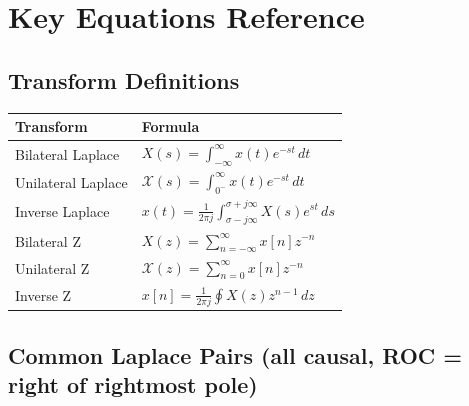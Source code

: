 \documentclass{article}
\begin{document}
\section{Key Equations Reference}

\subsection{Transform Definitions}

\begin{center}
\begin{tabular}{ll}
\toprule
Transform & Formula \\
\midrule
Bilateral Laplace & $\displaystyle X(s) = \int_{-\infty}^{\infty} x(t)e^{-st}\,dt$ \\
Unilateral Laplace & $\displaystyle \mathcal{X}(s) = \int_{0^-}^{\infty} x(t)e^{-st}\,dt$ \\
Inverse Laplace & $\displaystyle x(t) = \frac{1}{2\pi j}\int_{\sigma-j\infty}^{\sigma+j\infty} X(s)e^{st}\,ds$ \\
Bilateral Z & $\displaystyle X(z) = \sum_{n=-\infty}^{\infty} x[n]z^{-n}$ \\
Unilateral Z & $\displaystyle \mathcal{X}(z) = \sum_{n=0}^{\infty} x[n]z^{-n}$ \\
Inverse Z & $\displaystyle x[n] = \frac{1}{2\pi j}\oint X(z)z^{n-1}\,dz$ \\
\bottomrule
\end{tabular}
\end{center}

\subsection{Common Laplace Pairs (all causal, ROC = right of rightmost pole)}
\end{document}
